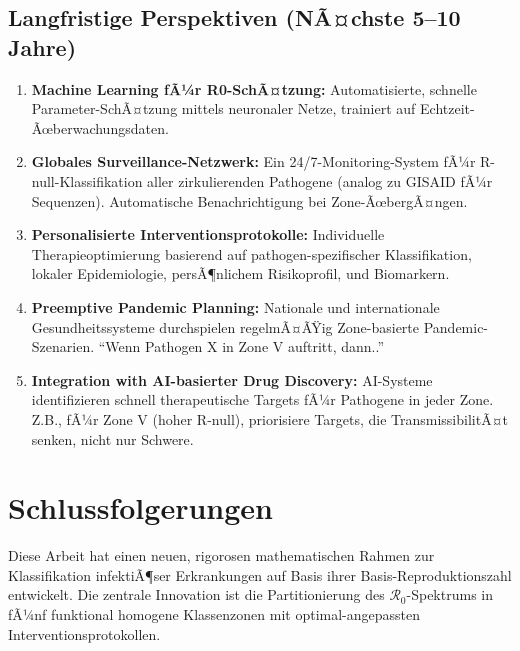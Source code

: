﻿\documentclass[a4paper,12pt,twoside]{article}
\theoremstyle{definition}
\begin{document}
\subsection{Langfristige Perspektiven (NÃ¤chste 5--10 Jahre)}

\begin{enumerate}

\item \textbf{Machine Learning fÃ¼r R0-SchÃ¤tzung:} Automatisierte, schnelle Parameter-SchÃ¤tzung mittels neuronaler Netze, trainiert auf Echtzeit-Ãœberwachungsdaten.

\item \textbf{Globales Surveillance-Netzwerk:} Ein 24/7-Monitoring-System fÃ¼r R-null-Klassifikation aller zirkulierenden Pathogene (analog zu GISAID fÃ¼r Sequenzen). Automatische Benachrichtigung bei Zone-ÃœbergÃ¤ngen.

\item \textbf{Personalisierte Interventionsprotokolle:} Individuelle Therapieoptimierung basierend auf pathogen-spezifischer Klassifikation, lokaler Epidemiologie, persÃ¶nlichem Risikoprofil, und Biomarkern.

\item \textbf{Preemptive Pandemic Planning:} Nationale und internationale Gesundheitssysteme durchspielen regelmÃ¤ÃŸig Zone-basierte Pandemic-Szenarien. ``Wenn Pathogen X in Zone V auftritt, dann..''

\item \textbf{Integration with AI-basierter Drug Discovery:} AI-Systeme identifizieren schnell therapeutische Targets fÃ¼r Pathogene in jeder Zone. Z.B., fÃ¼r Zone V (hoher R-null), priorisiere Targets, die TransmissibilitÃ¤t senken, nicht nur Schwere.

\end{enumerate}

\section{Schlussfolgerungen}
\label{sec:conclusion}

Diese Arbeit hat einen neuen, rigorosen mathematischen Rahmen zur Klassifikation infektiÃ¶ser Erkrankungen auf Basis ihrer Basis-Reproduktionszahl entwickelt. Die zentrale Innovation ist die Partitionierung des $\mathcal{R}_0$-Spektrums in fÃ¼nf funktional homogene Klassenzonen mit optimal-angepassten Interventionsprotokollen.
\end{document}
